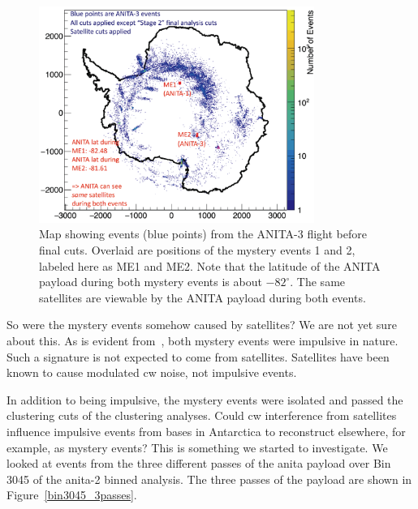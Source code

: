 \begin{figure}
\centering
\includegraphics[width=0.8\textwidth]{figures/me_map.png}
\caption{Map showing events (blue points) from the ANITA-3 flight before final cuts. Overlaid are positions of the mystery events 1 and 2, labeled here as ME1 and ME2. Note that the latitude of  the ANITA payload during both mystery events is about $-82^{\circ}$. The same satellites are viewable by the ANITA payload during both events.}   
\label{me_map}
\end{figure}

So were the mystery events somehow caused by satellites? We are not yet sure about this. As is evident from~\cite{me1,me2}, both mystery events were impulsive in nature. Such a signature is not expected to come from satellites. Satellites have been known to cause modulated \gls{cw} noise, not impulsive events. 

In addition to being impulsive, the mystery events were isolated and passed the clustering cuts of the clustering analyses. 
Could \gls{cw} interference from satellites influence impulsive events from bases in Antarctica to reconstruct elsewhere, for example, as mystery events? This is something we started to investigate. We looked at events from the three different passes of the \gls{anita} payload over Bin 3045 of the \gls{anita}-2 binned analysis. The three passes of the payload are shown in Figure~\ref{bin3045_3passes}. 

